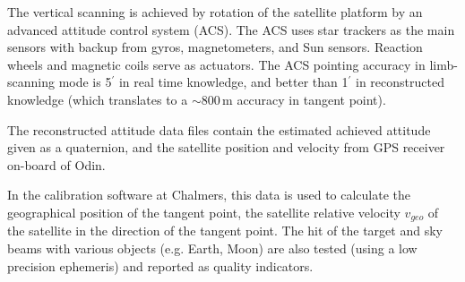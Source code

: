 The vertical scanning is achieved by rotation of the satellite
platform by an advanced attitude control system (ACS). 
The ACS uses star trackers as the main sensors with backup from gyros, 
magnetometers, and Sun sensors. Reaction wheels and magnetic coils serve as 
actuators. The ACS pointing accuracy in limb-scanning mode is 5\(^{'}\) in
real time knowledge, and better than 1\(^{'}\) in reconstructed knowledge
(which translates to a \(\sim\)800\,m accuracy in tangent point).

The reconstructed attitude data files contain the estimated
achieved attitude given as a quaternion, and the satellite position   
and velocity from GPS receiver on-board of Odin.

In the calibration software at Chalmers, this data is used to calculate
the geographical position of the tangent point, the satellite relative velocity 
\(v_{geo}\) of the satellite in the direction of the tangent point.
The hit of the target and sky beams with various objects (e.g. Earth, Moon) 
are also tested (using a low precision ephemeris)
and reported as quality indicators.

